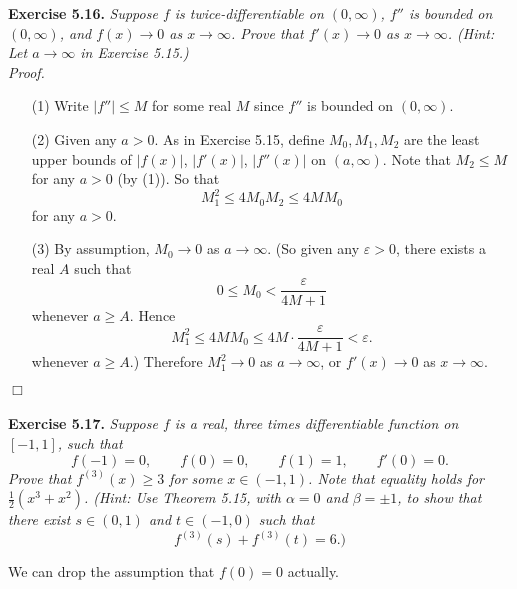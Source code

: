 \documentclass{article}
\begin{document}
\textbf{Exercise 5.16.}
\emph{Suppose $f$ is twice-differentiable on $(0,\infty)$,
$f''$ is bounded on $(0,\infty)$,
and $f(x) \to 0$ as $x \to \infty$.
Prove that $f'(x) \to 0$ as $x \to \infty$.
(Hint: Let $a \to \infty$ in Exercise 5.15.)} \\

\emph{Proof.}
\begin{enumerate}
\item[(1)]
Write $|f''| \leq M$ for some real $M$ since $f''$ is bounded on $(0,\infty)$.

\item[(2)]
Given any $a > 0$.
As in Exercise 5.15, define $M_0, M_1, M_2$ are the least upper bounds of
$|f(x)|$, $|f'(x)|$, $|f''(x)|$ on $(a,\infty)$.
Note that $M_2 \leq M$ for any $a > 0$ (by (1)).
So that
\[
  M_1^2 \leq 4 M_0 M_2 \leq 4M M_0
\]
for any $a > 0$.

\item[(3)]
By assumption, $M_0 \to 0$ as $a \to \infty$.
(So given any $\varepsilon > 0$, there exists a real $A$ such that
\[
  0 \leq M_0 < \frac{\varepsilon}{4M + 1}
\]
whenever $a \geq A$.
Hence
\[
  M_1^2 \leq 4M M_0 \leq 4M \cdot \frac{\varepsilon}{4M + 1} < \varepsilon.
\]
whenever $a \geq A$.)
Therefore $M_1^2 \to 0$ as $a \to \infty$,
or $f'(x) \to 0$ as $x \to \infty$.
\end{enumerate}
$\Box$ \\\\






\textbf{Exercise 5.17.}
\emph{Suppose $f$ is a real, three times differentiable function on $[-1,1]$, such that
\[
  f(-1)=0, \qquad
  f(0)=0, \qquad
  f(1)=1, \qquad
  f'(0)=0.
\]
Prove that $f^{(3)}(x) \geq 3$ for some $x \in (-1,1)$.
Note that equality holds for $\frac{1}{2}(x^3+x^2)$.
(Hint: Use Theorem 5.15, with $\alpha = 0$ and $\beta=\pm 1$,
to show that there exist $s \in (0,1)$ and $t \in (-1,0)$ such that
\[
  f^{(3)}(s) + f^{(3)}(t) = 6.)
\]}

We can drop the assumption that $f(0)=0$ actually. \\
\end{document}
